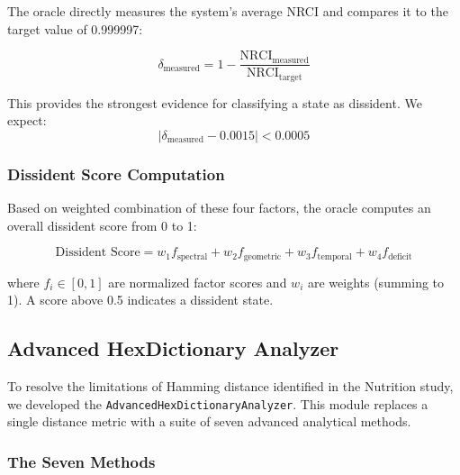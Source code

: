 \documentclass[12pt, a4paper]{article}
\begin{document}
The oracle directly measures the system's average NRCI and compares it to the target value of 0.999997:

\begin{equation}
\delta_{\text{measured}} = 1 - \frac{\text{NRCI}_{\text{measured}}}{\text{NRCI}_{\text{target}}}
\end{equation}

This provides the strongest evidence for classifying a state as dissident. We expect:
\begin{equation}
|\delta_{\text{measured}} - 0.0015| < 0.0005
\end{equation}

\subsubsection{Dissident Score Computation}

Based on weighted combination of these four factors, the oracle computes an overall dissident score from 0 to 1:

\begin{equation}
\text{Dissident Score} = w_1 f_{\text{spectral}} + w_2 f_{\text{geometric}} + w_3 f_{\text{temporal}} + w_4 f_{\text{deficit}}
\end{equation}

where $f_i \in [0,1]$ are normalized factor scores and $w_i$ are weights (summing to 1). A score above 0.5 indicates a dissident state.

\subsection{Advanced HexDictionary Analyzer}

To resolve the limitations of Hamming distance identified in the Nutrition study, we developed the \texttt{AdvancedHexDictionaryAnalyzer}. This module replaces a single distance metric with a suite of seven advanced analytical methods.

\subsubsection{The Seven Methods}
\end{document}
